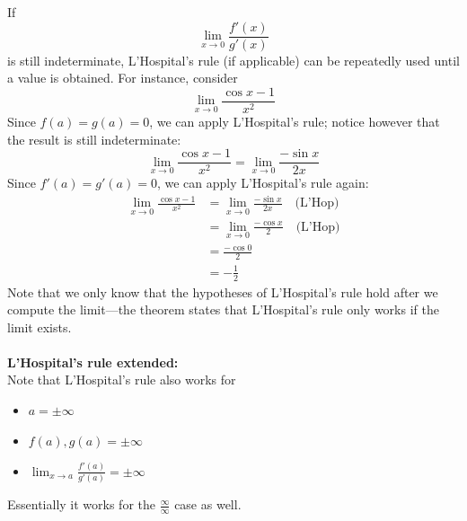 \documentclass{report}
\begin{document}
If
\begin{equation*}
\lim_{x\to0}\frac{f'(x)}{g'(x)} 
\end{equation*}
is still indeterminate, L'Hospital's rule (if applicable) can be repeatedly used until a value 
is obtained. For instance, consider
\begin{equation*}
\lim_{x\to0}\frac{\cos x-1}{x^2}
\end{equation*}
Since $f(a)=g(a)=0$, we can apply L'Hospital's rule; notice however that the result is still indeterminate:
\begin{equation*}
\lim_{x\to0}\frac{\cos x-1}{x^2}=\lim_{x\to0}\frac{-\sin x}{2x}
\end{equation*}
Since $f'(a)=g'(a)=0$, we can apply L'Hospital's rule again:
\begin{align*}
\lim_{x\to0}\frac{\cos x-1}{x^2}
&=\lim_{x\to0}\frac{-\sin x}{2x}\quad\text{(L'Hop)}\\
&=\lim_{x\to0}\frac{-\cos x}{2}\quad\text{(L'Hop)}\\
&=\frac{-\cos0}{2}\\
&=-\frac{1}{2}
\end{align*}
Note that we only know that the hypotheses of L'Hospital's rule hold after we compute the 
limit---the theorem states that L'Hospital's rule only works if the limit exists.\\
\vspace{1mm}\\
\textbf{L'Hospital's rule extended:}\\
Note that L'Hospital's rule also works for
\begin{itemize}
\item $a=\pm\infty$
\item $f(a),g(a)=\pm\infty$
\item $\lim_{x\to a}\frac{f'(a)}{g'(a)}=\pm\infty$
\end{itemize}
Essentially it works for the $\frac{\infty}{\infty}$ case as well.
\newpage
\end{document}
